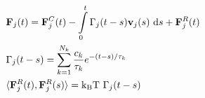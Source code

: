 \documentclass[12pt]{article}
\begin{document}
 
\begin{align*}
 &{\bf F}_{j}(t) = {\bf F}^C_j(t)-\int \limits_{0}^{t} \Gamma_j(t-s) {\bf v}_j(s)~\text{d}s + {\bf F}^R_j(t) \\
 &\Gamma_j(t-s) = \sum \limits_{k=1}^{N_k} \frac{c_k}{\tau_k} e^{-(t-s)/\tau_k} \\ 
 &\langle{\bf F}^R_j(t),{\bf F}^R_j(s)\rangle = \text{k$_\text{B}$T} ~\Gamma_j(t-s)
\end{align*}
\end{document}
